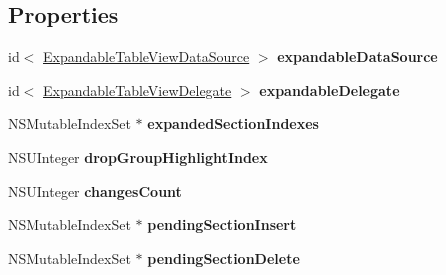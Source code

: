 \subsection*{Properties}
\begin{DoxyCompactItemize}
\item 
\hypertarget{category_expandable_table_view_07_08_a22a497c40ab4c20addcd28518341b336}{id$<$ \hyperlink{protocol_expandable_table_view_data_source-p}{Expandable\-Table\-View\-Data\-Source} $>$ {\bfseries expandable\-Data\-Source}}\label{category_expandable_table_view_07_08_a22a497c40ab4c20addcd28518341b336}

\item 
\hypertarget{category_expandable_table_view_07_08_a7afdd89456fd0f4175c7415cf45326b7}{id$<$ \hyperlink{protocol_expandable_table_view_delegate-p}{Expandable\-Table\-View\-Delegate} $>$ {\bfseries expandable\-Delegate}}\label{category_expandable_table_view_07_08_a7afdd89456fd0f4175c7415cf45326b7}

\item 
\hypertarget{category_expandable_table_view_07_08_a1653a570a4a0340a3a056841e13aac35}{N\-S\-Mutable\-Index\-Set $\ast$ {\bfseries expanded\-Section\-Indexes}}\label{category_expandable_table_view_07_08_a1653a570a4a0340a3a056841e13aac35}

\item 
\hypertarget{category_expandable_table_view_07_08_a36f10bc56abf602ede27a64673cb1f4e}{N\-S\-U\-Integer {\bfseries drop\-Group\-Highlight\-Index}}\label{category_expandable_table_view_07_08_a36f10bc56abf602ede27a64673cb1f4e}

\item 
\hypertarget{category_expandable_table_view_07_08_aec83e865fb15215fc79443f04ac02d07}{N\-S\-U\-Integer {\bfseries changes\-Count}}\label{category_expandable_table_view_07_08_aec83e865fb15215fc79443f04ac02d07}

\item 
\hypertarget{category_expandable_table_view_07_08_a63ca91f2dc7d42092f6cbd0198f5d1ed}{N\-S\-Mutable\-Index\-Set $\ast$ {\bfseries pending\-Section\-Insert}}\label{category_expandable_table_view_07_08_a63ca91f2dc7d42092f6cbd0198f5d1ed}

\item 
\hypertarget{category_expandable_table_view_07_08_a192e620979ba7d9fcae0daabe37b479e}{N\-S\-Mutable\-Index\-Set $\ast$ {\bfseries pending\-Section\-Delete}}\label{category_expandable_table_view_07_08_a192e620979ba7d9fcae0daabe37b479e}


\end{DoxyCompactItemize}
